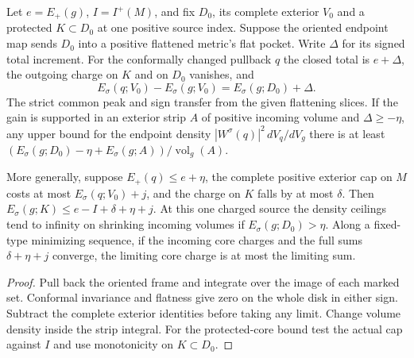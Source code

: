 \begin{proposition}
\label{prop:ed45-transport-charge}
\leanok
Let $e=E_+(g)$, $I=I^+(M)$, and fix $D_0$, its complete exterior $V_0$
and a protected $K\subset D_0$ at one positive source index. Suppose
the oriented endpoint map sends $D_0$ into a positive flattened metric's
flat pocket. Write $\Delta$ for its signed total increment.
For the conformally changed pullback $q$ the closed total is $e+\Delta$,
the outgoing charge on $K$ and on $D_0$ vanishes, and
\[
 E_\sigma(q;V_0)-E_\sigma(g;V_0)=E_\sigma(g;D_0)+\Delta .
\]
The strict common peak and sign transfer from the given flattening
slices. If the gain is supported in an exterior strip $A$ of positive
incoming volume and $\Delta\ge-\eta$, any upper bound for the endpoint
density $|W^\sigma(q)|^2\,dV_q/dV_g$ there is at least
$(E_\sigma(g;D_0)-\eta+E_\sigma(g;A))/\operatorname{vol}_g(A)$.

More generally, suppose $E_+(q)\le e+\eta$, the complete positive
exterior cap on $M$ costs at most $E_\sigma(q;V_0)+j$, and the charge
on $K$ falls by at most $\delta$. Then
$E_\sigma(g;K)\le e-I+\delta+\eta+j$. At this one charged source the
density ceilings tend to infinity on shrinking incoming volumes if
$E_\sigma(g;D_0)>\eta$. Along a fixed-type minimizing sequence, if the
incoming core charges and the full sums $\delta+\eta+j$ converge, the
limiting core charge is at most the limiting sum.
\end{proposition}
\begin{proof}
\leanok
Pull back the oriented frame and integrate over the image of each
marked set. Conformal invariance and flatness give zero on the whole
disk in either sign. Subtract the complete exterior identities before
taking any limit. Change volume density inside the strip integral.
For the protected-core bound test the actual cap against $I$ and use
monotonicity on $K\subset D_0$.
\end{proof}


